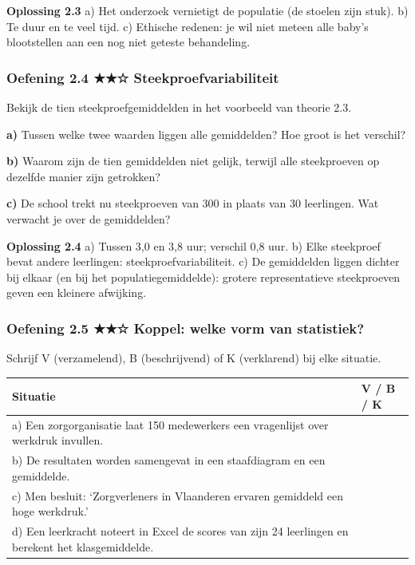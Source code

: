 \begin{oplossing}
\textbf{Oplossing 2.3} \quad a) Het onderzoek vernietigt de populatie (de stoelen zijn stuk). b) Te duur en te veel tijd. c) Ethische redenen: je wil niet meteen alle baby’s blootstellen aan een nog niet geteste behandeling.
\end{oplossing}

\subsubsection*{Oefening 2.4 \quad ★★☆ \quad Steekproefvariabiliteit}

Bekijk de tien steekproefgemiddelden in het voorbeeld van theorie 2.3.

\textbf{a)} Tussen welke twee waarden liggen alle gemiddelden? Hoe groot is het verschil? \lijn

\textbf{b)} Waarom zijn de tien gemiddelden niet gelijk, terwijl alle steekproeven op dezelfde manier zijn getrokken? \lijn

\textbf{c)} De school trekt nu steekproeven van 300 in plaats van 30 leerlingen. Wat verwacht je over de gemiddelden? \lijn

\begin{oplossing}
\textbf{Oplossing 2.4} \quad a) Tussen 3,0 en 3,8 uur; verschil 0,8 uur. b) Elke steekproef bevat andere leerlingen: steekproefvariabiliteit. c) De gemiddelden liggen dichter bij elkaar (en bij het populatiegemiddelde): grotere representatieve steekproeven geven een kleinere afwijking.
\end{oplossing}

\subsubsection*{Oefening 2.5 \quad ★★☆ \quad Koppel: welke vorm van statistiek?}

Schrijf V (verzamelend), B (beschrijvend) of K (verklarend) bij elke situatie.

\begin{tabular}{ll}
\hline
Situatie & V / B / K \\
\hline
a) Een zorgorganisatie laat 150 medewerkers een vragenlijst over werkdruk invullen. & \\
b) De resultaten worden samengevat in een staafdiagram en een gemiddelde. & \\
c) Men besluit: ‘Zorgverleners in Vlaanderen ervaren gemiddeld een hoge werkdruk.’ & \\
d) Een leerkracht noteert in Excel de scores van zijn 24 leerlingen en berekent het klasgemiddelde. & \\
\hline
\end{tabular}

